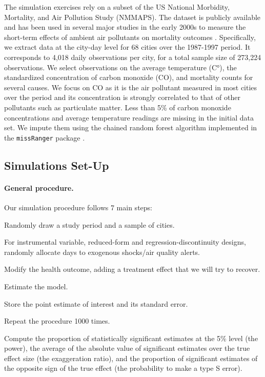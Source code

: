 \documentclass[12pt]{article}
\newenvironment{senumerate}{\enumerate\addtolength{\itemsep}{-10pt}}{\endenumerate} %
\begin{document}
        The simulation exercises rely on a subset of the US National Morbidity, Mortality, and Air Pollution Study (NMMAPS). The dataset is publicly available and has been used in several major studies in the early 2000s to measure the short-term effects of ambient air pollutants on mortality outcomes \citep{peng2008statistical}. Specifically, we extract data at the city-day level for 68 cities over the 1987-1997 period. It corresponds to 4,018 daily observations per city, for a total sample size of 273,224 observations. We select observations on the average temperature (C°), the standardized concentration of carbon monoxide (CO), and mortality counts for several causes. We focus on CO as it is the air pollutant measured in most cities over the period and its concentration is strongly correlated to that of other pollutants such as particulate matter. Less than 5\% of carbon monoxide concentrations and average temperature readings are missing in the initial data set. We impute them using the chained random forest algorithm implemented in the \texttt{missRanger} package \citep{mayer_missranger_2019}.
        
        \subsection{Simulations Set-Up}
        
        \paragraph{General procedure.} Our simulation procedure follows 7 main steps:
        
        \begin{sloppypar}
        \begin{senumerate}
            \item Randomly draw a study period and a sample of cities.
            \item For instrumental variable, reduced-form and regression-discontinuity designs, randomly allocate days to exogenous shocks/air quality alerts.
            \item Modify the health outcome, adding a treatment effect that we will try to recover.
            \item Estimate the model.
            \item Store the point estimate of interest and its standard error.
            \item Repeat the procedure 1000 times.
            \item Compute the proportion of statistically significant estimates at the 5\% level (the power), the average of the absolute value of significant estimates over the true effect size (the exaggeration ratio), and the proportion of significant estimates of the opposite sign of the true effect (the probability to make a type S error). 
        \end{senumerate}
        \end{sloppypar}
        
\end{document}
